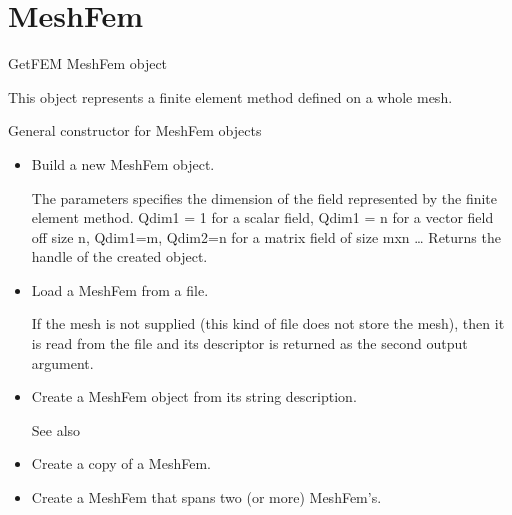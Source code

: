\documentclass[a4paper,11pt,english]{sphinxmanual}
\begin{document}
\section{MeshFem}
\label{\detokenize{python/cmdref_MeshFem:meshfem}}\label{\detokenize{python/cmdref_MeshFem::doc}}

\begin{fulllineitems}
\label{\detokenize{python/cmdref_MeshFem:getfem.MeshFem}}
GetFEM MeshFem object

This object represents a finite element method defined on a whole mesh.

General constructor for MeshFem objects
\begin{itemize}
\item {} 
Build a new MeshFem object.

The  parameters specifies the dimension of the field represented
by the finite element method. Qdim1 = 1 for a scalar field,
Qdim1 = n for a vector field off size n, Qdim1=m, Qdim2=n for
a matrix field of size mxn …
Returns the handle of the created object.

\item {} 
Load a MeshFem from a file.

If the mesh  is not supplied (this kind of file does not store the
mesh), then it is read from the file  and its descriptor is
returned as the second output argument.

\item {} 
Create a MeshFem object from its string description.

See also 

\item {} 
Create a copy of a MeshFem.

\item {} 
Create a MeshFem that spans two (or more) MeshFem’s.


\end{itemize}
\end{fulllineitems}
\end{document}
